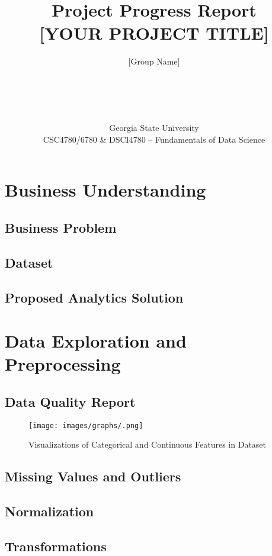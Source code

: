 \documentclass[12pt]{article}
\title{\vspace{-1.5cm}Project Progress Report \\ \large [YOUR PROJECT TITLE]}
\author{
[Group Name]\\
[Member 1]\\
[Member 2]\\
[Member 3]\\
[Member 4]\\
[Member 5]
}
\date{Georgia State University\\ CSC4780/6780 \& DSCI4780 – Fundamentals of Data Science \\ [Semester YEAR]}
\begin{document}
\maketitle
\newpage

\tableofcontents
\newpage

\section{Business Understanding}
\subsection{Business Problem}
\lipsum[1-2]

\subsection{Dataset}
\lipsum[3]

\subsection{Proposed Analytics Solution}
\lipsum[4-5]

\section{Data Exploration and Preprocessing}
\subsection{Data Quality Report}
\lipsum[6]

\begin{figure}[H]
\centering
\texttt{[image: images/graphs/.png]}
\caption{Visualizations of Categorical and Continuous Features in Dataset}
\end{figure}

\subsection{Missing Values and Outliers}
\lipsum[7]

\subsection{Normalization}
\lipsum[8]

\subsection{Transformations}
\lipsum[9]
\end{document}

